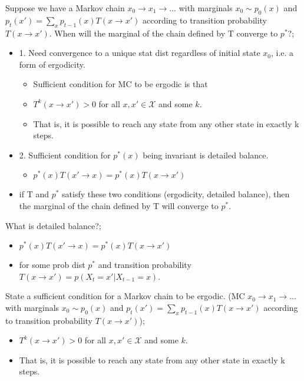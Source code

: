 \documentclass{article}
\begin{document}
Suppose we have a Markov chain $x_0 \rightarrow x_1 \rightarrow ...$ with marginals $x_0 \sim p_0(x)$ and $p_t(x') = \sum_x p_{t-1}(x)T(x\rightarrow x')$ according to transition probability $T(x\rightarrow x')$. When will the marginal of the chain defined by T converge to $p^*$?; \begin{itemize} \item 1. Need convergence to a unique stat dist regardless of initial state $x_0$, i.e. a form of ergodicity. \begin{itemize} \item Sufficient condition for MC to be ergodic is that \item $T^k(x\rightarrow x') > 0$ for all $x, x'\in \mathcal{X}$ and some $k$. \item That is, it is possible to reach any state from any other state in exactly k steps. \end{itemize} \item 2. Sufficient condition for $p^*(x)$ being invariant is detailed balance. \begin{itemize} \item $p^*(x)T(x'\rightarrow x) = p^*(x)T(x\rightarrow x')$ \end{itemize} \item if T and $p^*$ satisfy these two conditions (ergodicity, detailed balance), then the marginal of the chain defined by T will converge to $p^*$. \end{itemize}

What is detailed balance?; \begin{itemize} \item $p^*(x)T(x'\rightarrow x) = p^*(x)T(x\rightarrow x')$ \item for some prob dist $p^*$ and transition probability $T(x\rightarrow x') = p(X_t = x'|X_{t-1}=x)$. \end{itemize}

State a sufficient condition for a Markov chain to be ergodic. (MC $x_0 \rightarrow x_1 \rightarrow ...$ with marginals $x_0 \sim p_0(x)$ and $p_t(x') = \sum_x p_{t-1}(x)T(x\rightarrow x')$ according to transition probability $T(x\rightarrow x')$); \begin{itemize} \item $T^k(x\rightarrow x') > 0$ for all $x, x'\in \mathcal{X}$ and some $k$. \item That is, it is possible to reach any state from any other state in exactly k steps. \end{itemize}
    
\end{document}

